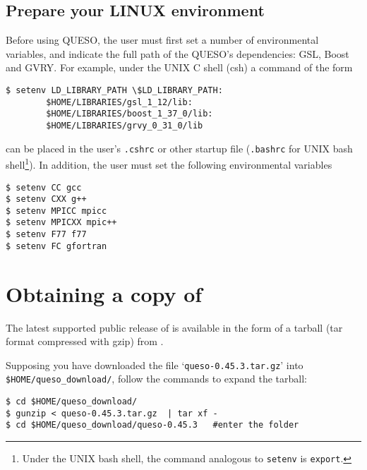 \subsection{Prepare your LINUX environment}\label{sec:prepare}



Before using QUESO, the user must first set a number of environmental variables, and indicate the full path
of the QUESO's dependencies: GSL, Boost and GVRY. For example, under the UNIX C shell (csh) a command of the form
\begin{lstlisting}
$ setenv LD_LIBRARY_PATH \$LD_LIBRARY_PATH:
		$HOME/LIBRARIES/gsl_1_12/lib:
		$HOME/LIBRARIES/boost_1_37_0/lib:
		$HOME/LIBRARIES/grvy_0_31_0/lib
\end{lstlisting}
can be placed in the user's \verb+.cshrc+ or other startup file (\verb+.bashrc+ for UNIX bash shell\footnote{Under the UNIX bash shell, the command analogous to \texttt{setenv} is \texttt{export}.}). In addition, the user must set the following environmental
variables
\begin{lstlisting}
$ setenv CC gcc
$ setenv CXX g++
$ setenv MPICC mpicc
$ setenv MPICXX mpic++
$ setenv F77 f77
$ setenv FC gfortran 
\end{lstlisting}



\section{Obtaining a copy of \Queso{}}

The latest supported public release of \Queso{} is available in the form of a tarball (tar format compressed with gzip) from \Quesoweb{}.

Supposing you have downloaded the file `\verb+queso-0.45.3.tar.gz+' into \texttt{\$HOME/queso\_download/}, follow the commands to expand the tarball:
\begin{lstlisting}
$ cd $HOME/queso_download/
$ gunzip < queso-0.45.3.tar.gz  | tar xf -
$ cd $HOME/queso_download/queso-0.45.3   #enter the folder 
\end{lstlisting}


